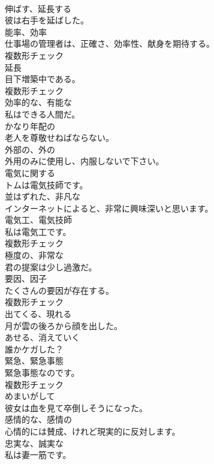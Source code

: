 \documentclass[8pt]{extreport}
\begin{document}
\begin{CJK}{UTF8}{min}
\\	[動詞]	伸ばす、延⻑する	
\\	彼は右手を延ばした。	
\\	[名詞]	能率、効率	
\\	仕事場の管理者は、正確さ、効率性、献身を期待する。	
\\	複数形チェック
\\	[名詞]	延⻑	
\\	目下増築中である。	
\\	複数形チェック
\\	[形容詞]	効率的な、有能な	
\\	私はできる人間だ。	
\\	[形容詞]	かなり年配の	
\\	老人を尊敬せねばならない。	
\\	[形容詞]	外部の、外の	
\\	外用のみに使用し、内服しないで下さい。	
\\	[形容詞]	電気に関する	
\\	トムは電気技師です。	
\\	[形容詞]	並はずれた、非凡な	
\\	インターネットによると、非常に興味深いと思います。	
\\	[名詞]	電気工、電気技師	
\\	私は電気工です。	
\\	複数形チェック
\\	[形容詞]	極度の、非常な	
\\	君の提案は少し過激だ。	
\\	[名詞]	要因、因子	
\\	たくさんの要因が存在する。	
\\	複数形チェック
\\	[動詞]	出てくる、現れる	
\\	月が雲の後ろから顔を出した。	
\\	[動詞]	あせる、消えていく	
\\	誰かケガした？	
\\	[名詞]	緊急、緊急事態	
\\	緊急事態なのです。	
\\	複数形チェック
\\	[形容詞]	めまいがして	
\\	彼女は血を見て卒倒しそうになった。	
\\	[形容詞]	感情的な、感情の	
\\	心情的には賛成、けれど現実的に反対します。	
\\	[形容詞]	忠実な、誠実な	
\\	私は妻一筋です。	

\end{CJK}
\end{document}
